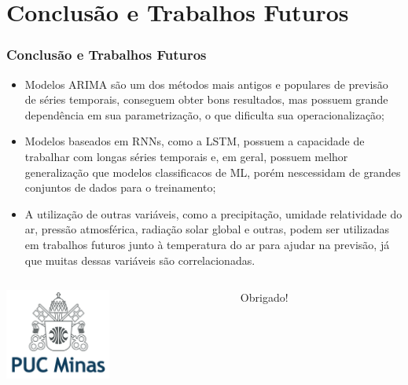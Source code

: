 \documentclass[aspectratio=169]{beamer}
\begin{document}
\section{Conclusão e Trabalhos Futuros}

\begin{frame}
\frametitle{Conclusão e Trabalhos Futuros}

\begin{itemize}
   	\item Modelos ARIMA são um dos métodos mais antigos e populares de previsão de séries temporais, conseguem obter bons resultados, mas possuem grande dependência em sua parametrização, o que dificulta sua operacionalização; 
   	\item Modelos baseados em RNNs, como a LSTM, possuem a capacidade de trabalhar com longas séries temporais e, em geral, possuem melhor generalização que modelos classificacos de ML, porém nescessidam de grandes conjuntos de dados para o treinamento;  
	\item A utilização de outras variáveis, como a precipitação, umidade relatividade do ar, pressão atmosférica, radiação solar global  e outras, podem ser utilizadas em trabalhos futuros junto à temperatura do ar para ajudar na previsão, já que muitas dessas variáveis são correlacionadas.  
\end{itemize}
\end{frame}


% 	


\begin{frame}
	\begin{columns}
		\begin{column}{3cm}
			\includegraphics[height=3cm]{figuras/logo.png}
		\end{column}
		\begin{column}{7cm}
			\begin{flushright}
				\centering
				\vskip 0.5cm
				\Huge Obrigado!
			\end{flushright}
		\end{column}
	\end{columns}
\end{frame}


\end{document}
